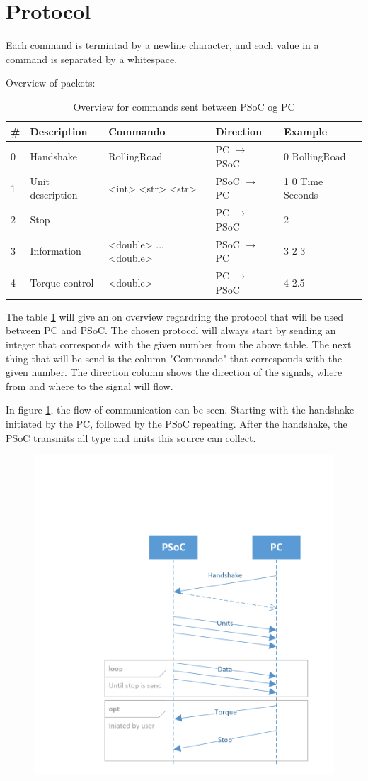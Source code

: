 \section{Protocol}

Each command is termintad by a newline character, and each value in a command is separated by a whitespace.

Overview of packets:
\begin{table}[h!]
	\centering
	\label{Protocol:overview}
	\begin{tabular}{l|llll}
		\# & Description 		& Commando    		& Direction             & Example     		\\\hline
		0  & Handshake   		& RollingRoad 		& PC $\rightarrow$ PSoC & 0 RollingRoad 	\\
		1  & Unit description 	& <int> <str> <str> & PSoC $\rightarrow$ PC & 1 0 Time Seconds 	\\
		2  & Stop        		&            		& PC $\rightarrow$ PSoC	& 2        			\\
		3  & Information 		& <double> ... <double>	& PSoC $\rightarrow$ PC & 3 2 3 	    	\\
		4  & Torque control 	& <double>    			& PC $\rightarrow$ PSoC & 4 2.5  				\\
	\end{tabular}
	\caption{Overview for commands sent between PSoC og PC}
\end{table}

The table \ref{Protocol:overview} will give an on overview regardring the protocol that will be used between PC and PSoC. The chosen protocol will always start by sending an integer that corresponds with the given number from the above table.  The next thing that will be send is the column "Commando" that corresponds with the given number. The direction column shows the direction of the signals, where from and where to the signal will flow.      

In figure \ref{fig:TimingDiagram}, the flow of communication can be seen. Starting with the handshake initiated by the PC, followed by the PSoC repeating. After the handshake, the PSoC transmits all type and units this source can collect.

\begin{figure}
\centering
\includegraphics[width=0.5\linewidth]{Protocol/TimingDiagram}
\caption{}
\label{fig:TimingDiagram}
\end{figure}


